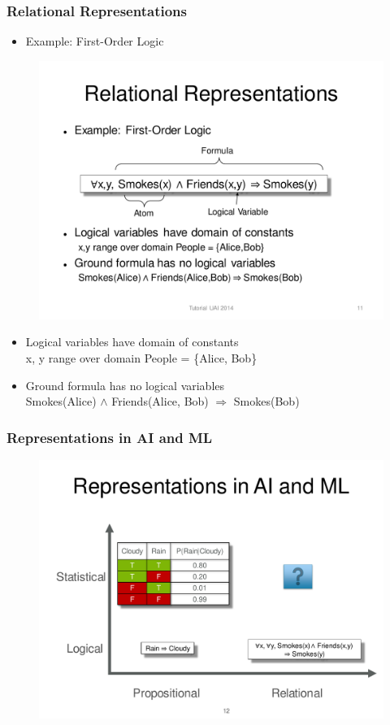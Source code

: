 \documentclass{beamer}
\newcommand{\bi}{\begin{itemize}}
\newcommand{\ei}{\end{itemize}}
\newcommand{\ii}{\item}
\begin{document}
\begin{frame}
\frametitle{Relational Representations}
\bi
\ii Example: First-Order Logic
\ei
\begin{figure}[h]
\centering\includegraphics[width=0.75\linewidth]{first-order-logic.pdf}
\end{figure}

\bi
\ii Logical variables have domain of constants \\
x, y range over domain People = \{Alice, Bob\}
\ii Ground formula has no logical variables \\
Smokes(Alice) $\wedge$ Friends(Alice, Bob) $\Rightarrow$ Smokes(Bob)
\ei

\end{frame}

\begin{frame}
\frametitle{Representations in AI and ML}
\begin{figure}[h]
\centering\includegraphics[width=0.95\linewidth]{ai-ml2.pdf}
\end{figure}
\end{frame}
\end{document}
